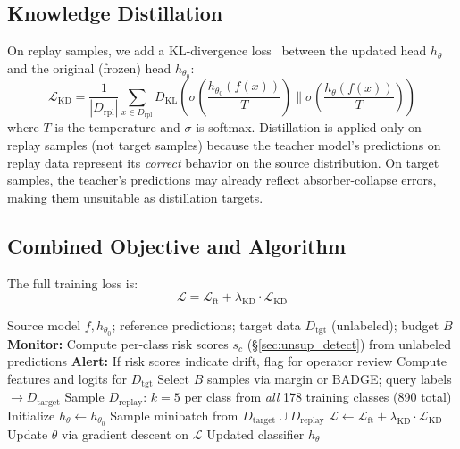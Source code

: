 \documentclass[journal]{IEEEtran}
\newcommand{\ours}{CARE}  %
\begin{document}
\subsection{Knowledge Distillation}
\label{sec:distill}

On replay samples, we add a KL-divergence loss~\cite{hinton2015distilling} between the updated head $h_\theta$ and the original (frozen) head $h_{\theta_0}$:
\begin{equation}
  \mathcal{L}_{\text{KD}} = \frac{1}{|D_{\text{rpl}}|} \!\sum_{x \in D_{\text{rpl}}} D_{\text{KL}}\!\!\left(\sigma\!\!\left(\frac{h_{\theta_0}\!(f(x))}{T}\right) \!\Big\|\! \sigma\!\!\left(\frac{h_\theta\!(f(x))}{T}\right)\!\right)
\end{equation}
where $T$ is the temperature and $\sigma$ is softmax.
Distillation is applied only on replay samples (not target samples) because the teacher model's predictions on replay data represent its \textit{correct} behavior on the source distribution.
On target samples, the teacher's predictions may already reflect absorber-collapse errors, making them unsuitable as distillation targets.

\subsection{Combined Objective and Algorithm}

The full training loss is:
\begin{equation}
  \mathcal{L} = \mathcal{L}_{\text{ft}} + \lambda_{\text{KD}} \cdot \mathcal{L}_{\text{KD}}
\end{equation}

\begin{algorithm}[t]
\caption{\ours{}: Collapse-Aware Active Repair}
\label{alg:care}
\begin{algorithmic}[1]
\REQUIRE Source model $f, h_{\theta_0}$; reference predictions; target data $D_{\text{tgt}}$ (unlabeled); budget $B$
\STATE \textbf{Monitor:} Compute per-class risk scores $s_c$ (\S\ref{sec:unsup_detect}) from unlabeled predictions
\STATE \textbf{Alert:} If risk scores indicate drift, flag for operator review
\STATE Compute features and logits for $D_{\text{tgt}}$
\STATE Select $B$ samples via margin or BADGE; query labels $\to D_{\text{target}}$
\STATE Sample $D_{\text{replay}}$: $k{=}5$ per class from \textit{all} 178 training classes (890 total)
\STATE Initialize $h_\theta \leftarrow h_{\theta_0}$
  \STATE Sample minibatch from $D_{\text{target}} \cup D_{\text{replay}}$
  \STATE $\mathcal{L} \leftarrow \mathcal{L}_{\text{ft}} + \lambda_{\text{KD}} \cdot \mathcal{L}_{\text{KD}}$
  \STATE Update $\theta$ via gradient descent on $\mathcal{L}$
\ENDFOR
\RETURN Updated classifier $h_\theta$
\end{algorithmic}
\end{algorithm}
\end{document}
